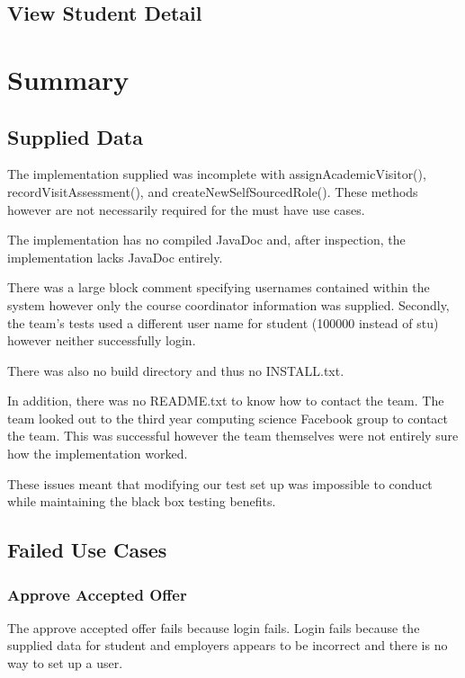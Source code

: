 \documentclass[11pt]{l3deliverable}
\begin{document}
\newpage

\subsection{View Student Detail}

\newpage

\section{Summary}

\subsection{Supplied Data}

The implementation supplied was incomplete with assignAcademicVisitor(),
recordVisitAssessment(), and createNewSelfSourcedRole(). These methods however
are not necessarily required for the must have use cases.

The implementation has no compiled JavaDoc and, after inspection, the
implementation lacks JavaDoc entirely.

There was a large block comment specifying usernames contained within the
system however only the course coordinator information was supplied. Secondly,
the team's tests used a different user name for student (100000 instead of
stu) however neither successfully login.

There was also no build directory and thus no INSTALL.txt.

In addition, there was no README.txt to know how to contact the team. The
team looked out to the third year computing science Facebook group to contact
the team. This was successful however the team themselves were not entirely
sure how the implementation worked.

These issues meant that modifying our test set up was impossible to conduct
while maintaining the black box testing benefits.

\subsection{Failed Use Cases}

\subsubsection{Approve Accepted Offer}

The approve accepted offer fails because login fails. Login fails because the
supplied data for student and employers appears to be incorrect and there is
no way to set up a user.
\end{document}
